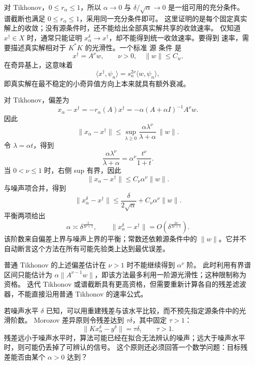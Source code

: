 对 Tikhonov，$0\le r_\alpha\le1$，所以 $\alpha\to0$ 与 $\delta/\sqrt\alpha\to0$ 是一组可用的充分条件。
谱截断也满足 $0\le r_\alpha\le1$，采用同一充分条件即可。
这里证明的是每个固定真实解上的收敛；没有源条件时，还不能给出全部真实解共享的收敛速率。
仅知道 $x^\dagger\in X$ 时，通常只能证明 $x_\alpha^\delta\to x^\dagger$，却不能得到统一收敛速率。要得到 速率，需要描述真实解相对于 $K^*K$ 的光滑性。一个标准 源 条件 是
\[
\boxed{
x^\dagger=A^\nu w,
\qquad \nu>0,
\quad \|w\|\le C_w}.
\]
在奇异基上，这意味着
\[
\langle x^\dagger,\psi_n\rangle
=s_n^{2\nu}\langle w,\psi_n\rangle,
\]
即真实解在最不稳定的小奇异值方向上本来就具有额外衰减。

对 Tikhonov，偏差为
\[
x_\alpha-x^\dagger
=-r_\alpha(A)x^\dagger
=-\alpha(A+\alpha I)^{-1}A^\nu w.
\]
因此
\[
\|x_\alpha-x^\dagger\|
\le
\sup_{\lambda\ge0}
\frac{\alpha\lambda^\nu}{\lambda+\alpha}\,\|w\|.
\]
令 $\lambda=\alpha t$，得到
\[
\frac{\alpha\lambda^\nu}{\lambda+\alpha}
=
\alpha^\nu\frac{t^\nu}{1+t}.
\]
当 $0<\nu\le1$ 时，右侧 sup 有界，因此
\[
\boxed{
\|x_\alpha-x^\dagger\|
\le C_\nu\alpha^\nu\|w\|
}.
\]
与噪声项合并，得到
\[
\|x_\alpha^\delta-x^\dagger\|
\le
\frac{\delta}{2\sqrt\alpha}
+C_\nu\alpha^\nu\|w\|.
\]
平衡两项给出
\[
\alpha\asymp\delta^{\frac{2}{2\nu+1}},
\qquad
\boxed{
\|x_\alpha^\delta-x^\dagger\|
=O\!\left(
\delta^{\frac{2\nu}{2\nu+1}}
\right)}.
\]
该阶数来自偏差上界与噪声上界的平衡；常数还依赖源条件中的 $\|w\|$。它并不自动断言这个方法在所有可能先验类上达到最优误差。

普通 Tikhonov 的上述偏差估计在 $\nu>1$ 时不能继续得到 $\alpha^\nu$ 阶。
此时利用有界谱区间只能估计为 $\alpha\|A^{\nu-1}w\|$，即该方法最多利用一阶源光滑性；这种限制称为资格。
迭代 Tikhonov 或谱截断具有更高资格，但需要重新计算各自的残差滤波器，不能直接沿用普通 Tikhonov 的速率公式。

若噪声水平 $\delta$ 已知，可以用重建残差与该水平比较，而不预先指定源条件中的光滑阶数。
Morozov 差异原则令残差达到 $\tau\delta$，其中固定 $\tau>1$：
\[
\boxed{
\|Kx_\alpha^\delta-y^\delta\|
=\tau\delta,
\qquad \tau>1
}.
\]
残差远小于噪声水平时，算法可能已经在拟合无法辨认的噪声；远大于噪声水平时，则可能仍丢掉了可辨认的信号。
这个原则还必须回答一个数学问题：目标残差能否由某个 $\alpha>0$ 达到？

